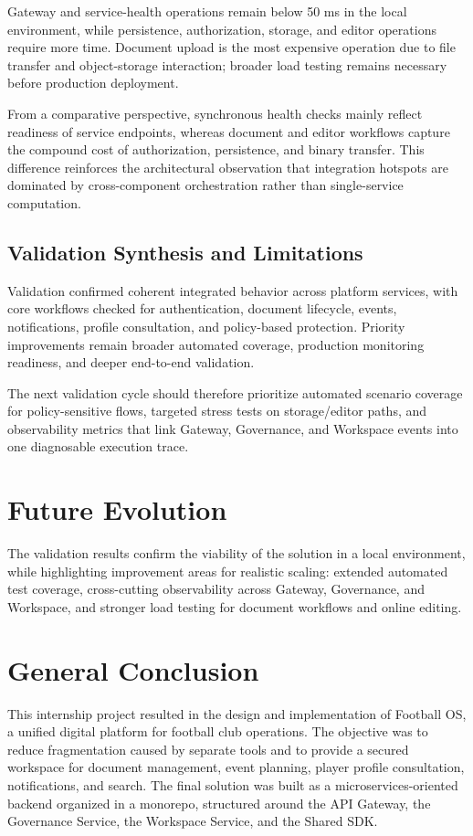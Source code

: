 Gateway and service-health operations remain below 50 ms in the local
environment, while persistence, authorization, storage, and editor operations
require more time. Document upload is the most expensive operation due to file
transfer and object-storage interaction; broader load testing remains necessary
before production deployment.

From a comparative perspective, synchronous health checks mainly reflect
readiness of service endpoints, whereas document and editor workflows capture
the compound cost of authorization, persistence, and binary transfer. This
difference reinforces the architectural observation that integration hotspots
are dominated by cross-component orchestration rather than single-service
computation.

\subsection{Validation Synthesis and Limitations}

Validation confirmed coherent integrated behavior across platform services, with
core workflows checked for authentication, document lifecycle, events,
notifications, profile consultation, and policy-based protection. Priority
improvements remain broader automated coverage, production monitoring readiness,
and deeper end-to-end validation.

The next validation cycle should therefore prioritize automated scenario
coverage for policy-sensitive flows, targeted stress tests on storage/editor
paths, and observability metrics that link Gateway, Governance, and Workspace
events into one diagnosable execution trace.


\section{Future Evolution}
The validation results confirm the viability of the solution in a local
environment, while highlighting improvement areas for realistic scaling:
extended automated test coverage, cross-cutting observability across Gateway,
Governance, and Workspace, and stronger load testing for document workflows
and online editing.

\section{General Conclusion}

This internship project resulted in the design and implementation of Football
OS, a unified digital platform for football club operations. The objective was
to reduce fragmentation caused by separate tools and to provide a secured
workspace for document management, event planning, player profile consultation,
notifications, and search. The final solution was built as a
microservices-oriented backend organized in a monorepo, structured around the
API Gateway, the Governance Service, the Workspace Service, and the Shared SDK.
\vspace{0.15cm}

